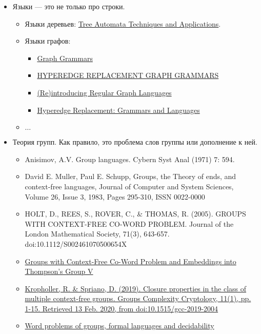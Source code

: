 \begin{itemize}
  \item Языки --- это не только про строки.
  \begin{itemize}
    \item Языки деревьев: \href{http://tata.gforge.inria.fr/}{Tree Automata Techniques and Applications}.
    \item Языки графов:
    \begin{itemize}
      \item \href{http://www.its.caltech.edu/~matilde/GraphGrammarsLing.pdf}{Graph Grammars}
      \item \href{https://people.cs.umu.se/drewes/biblio/ps-files/hrg.pdf}{HYPEREDGE REPLACEMENT GRAPH GRAMMARS}
      \item \href{https://www.aclweb.org/anthology/W17-3410.pdf}{(Re)introducing Regular Graph Languages}
      \item \href{https://www.springer.com/gp/book/9783540560050}{Hyperedge Replacement: Grammars and Languages}
    \end{itemize}
    \item $\ldots$
  \end{itemize}
  \item Теория групп. Как правило, это проблема слов группы или дополнение к ней.
  \begin{itemize}
    \item Anisimov, A.V. Group languages. Cybern Syst Anal (1971) 7: 594.
    \item David E. Muller, Paul E. Schupp, Groups, the Theory of ends, and context-free languages, Journal of Computer and System Sciences, Volume 26, Issue 3, 1983, Pages 295-310, ISSN 0022-0000
    \item HOLT, D., REES, S., ROVER, C., \& THOMAS, R. (2005). GROUPS WITH CONTEXT-FREE CO-WORD PROBLEM. Journal of the London Mathematical Society, 71(3), 643-657. doi:10.1112/S002461070500654X
    \item \href{https://arxiv.org/abs/1407.7745}{Groups with Context-Free Co-Word Problem and Embeddings into Thompson's Group V}
    \item \href{https://www.degruyter.com/view/j/gcc.2019.11.issue-1/gcc-2019-2004/gcc-2019-2004.xml}{Kropholler, R. \& Spriano, D. (2019). Closure properties in the class of multiple context-free groups. Groups Complexity Cryptology, 11(1), pp. 1-15. Retrieved 13 Feb. 2020, from doi:10.1515/gcc-2019-2004}
    \item \href{https://personalpages.manchester.ac.uk/staff/Mark.Kambites/events/nbsan/nbsan17_thomas.pdf}{Word problems of groups, formal languages and decidability}
  \end{itemize}


\end{itemize}
